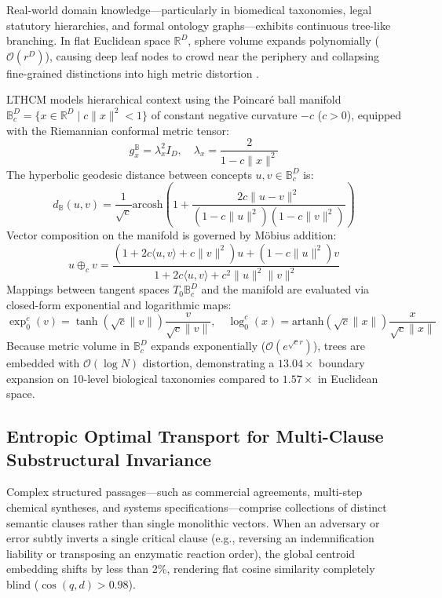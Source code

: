 \documentclass[11pt,a4paper]{article}
\begin{document}
Real-world domain knowledge---particularly in biomedical taxonomies, legal statutory hierarchies, and formal ontology graphs---exhibits continuous tree-like branching. In flat Euclidean space $\mathbb{R}^D$, sphere volume expands polynomially ($\mathcal{O}(r^D)$), causing deep leaf nodes to crowd near the periphery and collapsing fine-grained distinctions into high metric distortion \cite{nickel2017poincare}.

LTHCM models hierarchical context using the Poincar{\'e} ball manifold $\mathbb{B}^D_c = \{x \in \mathbb{R}^D \mid c \|x\|^2 < 1\}$ of constant negative curvature $-c$ ($c > 0$), equipped with the Riemannian conformal metric tensor:
\begin{equation}
    g_x^{\mathbb{B}} = \lambda_x^2 I_D, \quad \lambda_x = \frac{2}{1 - c \|x\|^2}
\end{equation}
The hyperbolic geodesic distance between concepts $u, v \in \mathbb{B}^D_c$ is:
\begin{equation}
    d_{\mathbb{B}}(u, v) = \frac{1}{\sqrt{c}} \mathrm{arcosh}\left( 1 + \frac{2c \|u - v\|^2}{(1 - c\|u\|^2)(1 - c\|v\|^2)} \right)
\end{equation}
Vector composition on the manifold is governed by M{\"o}bius addition:
\begin{equation}
    u \oplus_c v = \frac{(1 + 2c \langle u, v \rangle + c \|v\|^2)u + (1 - c \|u\|^2)v}{1 + 2c \langle u, v \rangle + c^2 \|u\|^2 \|v\|^2}
\end{equation}
Mappings between tangent spaces $T_0 \mathbb{B}^D_c$ and the manifold are evaluated via closed-form exponential and logarithmic maps:
\begin{equation}
    \exp_0^c(v) = \tanh(\sqrt{c} \|v\|) \frac{v}{\sqrt{c} \|v\|}, \quad \log_0^c(x) = \mathrm{artanh}(\sqrt{c} \|x\|) \frac{x}{\sqrt{c} \|x\|}
\end{equation}
Because metric volume in $\mathbb{B}^D_c$ expands exponentially ($\mathcal{O}(e^{\sqrt{c} r})$), trees are embedded with $\mathcal{O}(\log N)$ distortion, demonstrating a $13.04\times$ boundary expansion on 10-level biological taxonomies compared to $1.57\times$ in Euclidean space.

\subsection{Entropic Optimal Transport for Multi-Clause Substructural Invariance}

Complex structured passages---such as commercial agreements, multi-step chemical syntheses, and systems specifications---comprise collections of distinct semantic clauses rather than single monolithic vectors. When an adversary or error subtly inverts a single critical clause (e.g., reversing an indemnification liability or transposing an enzymatic reaction order), the global centroid embedding shifts by less than 2\%, rendering flat cosine similarity completely blind ($\cos(q, d) > 0.98$).
\end{document}
